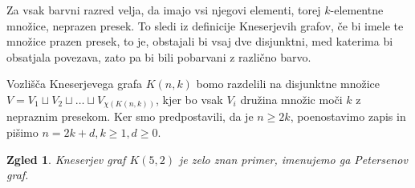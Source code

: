 \documentclass[a4paper,12pt]{article}
\newtheorem{zgled}{Zgled}
\begin{document}
Za vsak barvni razred velja, da imajo vsi njegovi elementi, torej $k$-elementne množice, neprazen presek. To sledi iz definicije Kneserjevih grafov, če bi imele te množice prazen presek, to je, obstajali bi vsaj dve disjunktni, med katerima bi obsatjala povezava, zato pa bi bili pobarvani z različno barvo.

Vozlišča Kneserjevega grafa $K(n,k)$ bomo razdelili na disjunktne množice $V = V_1 \sqcup V_2 \sqcup \ldots \sqcup V_{\chi(K(n,k))}$, kjer bo vsak $V_i$ družina množic moči $k$ z nepraznim presekom. Ker smo predpostavili, da je $n \geq 2k$, poenostavimo zapis in pišimo $n = 2k + d, k \geq 1, d \geq 0$.

\newpage
\begin{zgled}{Kneserjev graf $K(5,2)$ je zelo znan primer, imenujemo ga Petersenov graf. 

}
\end{zgled}
\end{document}
